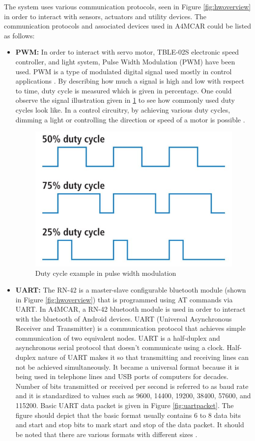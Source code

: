 The system uses various communication protocols, seen in Figure \ref{fig:hwoverview} in order to interact with sensors, actuators and utility devices. The communication protocols and associated devices used in A4MCAR could be listed as follows:
\begin{itemize}
	\item \textbf{PWM:} In order to interact with servo motor, TBLE-02S electronic speed controller, and light system, Pulse Width Modulation (PWM) have been used. PWM is a type of modulated digital signal used mostly in control applications \cite{pwm}. By describing how much a signal is high and low with respect to time, duty cycle is measured which is given in percentage. One could observe the signal illustration given in \ref{fig:pwm} to see how commonly used duty cycles look like. In a control circuitry, by achieving various duty cycles, dimming a light or controlling the direction or speed of a motor is possible \cite{pwm}.
	\begin{figure}[!ht]
		\includegraphics[scale=0.5]{content/images/pwm.jpg}
		\caption{Duty cycle example in pulse width modulation \cite{pwm}}
		\label{fig:pwm}
	\end{figure}
	\item \textbf{UART:} The RN-42 is a master-slave configurable bluetooth module (shown in Figure \ref{fig:hwoverview}) that is programmed using AT commands via UART. In A4MCAR, a RN-42 bluetooth module is used in order to interact with the bluetooth of Android devices. UART (Universal Asynchronous Receiver and Transmitter) is a communication protocol that achieves simple communication of two equivalent nodes. UART is a half-duplex and asynchronous serial protocol that doesn't communicate using a clock. Half-duplex nature of UART makes it so that transmitting and receiving lines can not be achieved simultaneously. It became a universal format because it is being used in telephone lines and USB ports of computers for decades. Number of bits transmitted or received per second is referred to as baud rate and it is standardized to values such as 9600, 14400, 19200, 38400, 57600, and 115200. Basic UART data packet is given in Figure \ref{fig:uartpacket}. The figure should depict that the basic format usually contains 6 to 8 data bits and start and stop bits to mark start and stop of the data packet. It should be noted that there are various formats with different sizes \cite{uart}.

\end{itemize}
